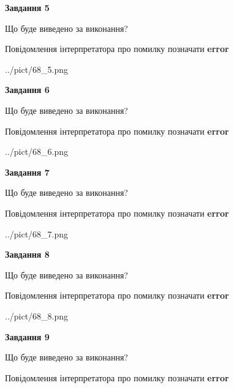 \documentclass[11pt, ukrainian]{article}
\begin{document}
{\begin {large}
{\begin {center}\textbf{Завдання 5}\end {center}}\par
Що буде виведено за виконання? \par
Повідомлення інтерпретатора про помилку позначати \textbf{error}

\begin{center}
	{../pict/68_5.png}
\end{center}
\newpage

{\begin {center}\textbf{Завдання 6}\end {center}}\par
Що буде виведено за виконання? \par
Повідомлення інтерпретатора про помилку позначати \textbf{error}

\begin{center}
	{../pict/68_6.png}
\end{center}
\newpage

{\begin {center}\textbf{Завдання 7}\end {center}}\par
Що буде виведено за виконання? \par
Повідомлення інтерпретатора про помилку позначати \textbf{error}

\begin{center}
	{../pict/68_7.png}
\end{center}
\newpage

{\begin {center}\textbf{Завдання 8}\end {center}}\par
Що буде виведено за виконання? \par
Повідомлення інтерпретатора про помилку позначати \textbf{error}

\begin{center}
	{../pict/68_8.png}
\end{center}
\newpage

{\begin {center}\textbf{Завдання 9}\end {center}}\par
Що буде виведено за виконання? \par
Повідомлення інтерпретатора про помилку позначати \textbf{error}


\end{large}}
\end{document}
